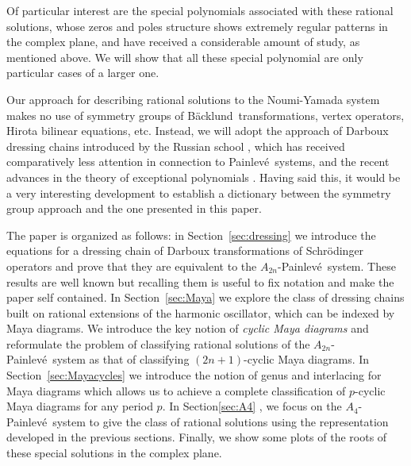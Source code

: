 \documentclass[10pt]{amsart}
\theoremstyle{definition}
\numberwithin{equation}{section}
\numberwithin{figure}{section}
\newcommand{\p}{Painlev\'{e}}
\newcommand{\bk}{B\"acklund}
\begin{document}
Of particular interest are the special polynomials associated with these rational solutions, whose zeros and poles structure shows extremely regular patterns in the complex plane, and have received a considerable amount of study, as mentioned above. 
We will show that all these special  polynomial  are only particular cases of a larger one.

Our approach for describing rational solutions to the Noumi-Yamada system makes no use of symmetry groups of \bk\ transformations, vertex operators, Hirota bilinear equations, etc. Instead, we will adopt the approach of Darboux dressing chains introduced by the Russian school \cite{adler1994nonlinear,veselov1993dressing}, which has received comparatively less attention in connection to \p\ systems, and the recent advances in the theory of exceptional polynomials \cite{gomez2009extended,gomez2010extension,gomez2016durfee}. 
Having said this, it would be a very interesting development to establish a dictionary between the symmetry group approach and the one presented in this paper.

The paper is organized as follows: in Section~\ref{sec:dressing} we introduce the equations for a dressing chain of Darboux transformations of Schr\"{o}dinger operators and prove that they are equivalent to the $A_{2n}$-\p\ system. These results are well known \cite{adler1994nonlinear} but recalling them is useful to fix notation and make the paper self contained.
In Section~\ref{sec:Maya} we explore the class of dressing chains built on rational extensions of the harmonic oscillator, which can be indexed by Maya diagrams. We introduce the key notion of \textit{cyclic Maya diagrams} and reformulate the problem of classifying rational solutions of the $A_{2n}$-\p\ system as that of classifying $(2n+1)$-cyclic Maya diagrams. In Section~\ref{sec:Mayacycles} we introduce the notion of genus and interlacing for Maya diagrams which allows us to achieve a complete classification of $p$-cyclic Maya diagrams for any period $p$. In Section\ref{sec:A4} , we focus on the $A_4$-\p\ system to give the class of rational solutions using the representation developed in the previous sections. Finally, we show some plots of the roots of these special solutions in the complex plane.
\end{document}
